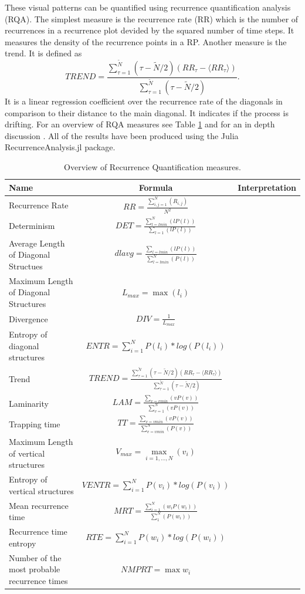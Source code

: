 \documentclass{article}
\begin{document}
These visual patterns can be quantified using recurrence quantification analysis (RQA)\cite{Zbilut}.
The simplest measure is the recurrence rate (RR) which is the number of recurrences in a recurrence plot devided by the squared number of time steps.
It measures the density of the recurrence points in a RP.
Another measure is the trend.
It is defined as
$$ TREND= \frac{\sum_{\tau=1}^{\tilde{N}}(\tau - \tilde{N}/2)(RR_\tau - \langle RR_\tau \rangle)}{\sum_{\tau=1}^{\tilde{N}}(\tau - \tilde{N}/2)}.$$
It is a linear regression coefficient over the recurrence rate of the diagonals in comparison to their distance to the main diagonal.
It indicates if the process is drifting.
For an overview of RQA measures see  Table \ref{RQA_table} and for an in depth discussion \cite{Marwan06}.
All of the results have been produced using the Julia RecurrenceAnalysis.jl package\cite{RQA.jl}.
\renewcommand{\arraystretch}{2}
\begin{table}[]
\begin{tabular}{@{}lcc@{}}
\toprule
 Name & Formula & Interpretation \\
 \midrule
 Recurrence Rate & $ RR= \frac{\sum\limits_{i,j=1}^N(R_{i,j})}{N^2} $ &  \\
 Determinism & $DET=\frac{\sum\limits_{l=lmin}^N(l P(l))}{\sum_{l=1}(l P(l))} $ &  \\
 Average Length of Diagonal Structues & $dlavg=\frac{\sum_{l=lmin}(l P(l))}{\sum_{l=lmin}^{N}(P(l))}$  &  \\
 Maximum Length of Diagonal Structures & $L_{max}=\max(l_i)$ &  \\
 Divergence & $DIV=\frac{1}{L_{max}}$ &  \\
 Entropy of diagonal structures & $ENTR=\sum\limits_{i=1}^N P(l_i) * log(P(l_i))$ &  \\
 Trend & $ TREND=\frac{\sum_{\tau=1}^{\tilde{N}}(\tau - \tilde{N}/2)(RR_\tau - \langle RR_\tau \rangle)}{\sum_{\tau=1}^{\tilde{N}}(\tau - \tilde{N}/2)}$ &  \\
 Laminarity & $LAM=\frac{\sum_{v=vmin}(v P(v))}{\sum_{v=1}^{N}(v P(v))}$ &  \\
 Trapping time & $TT=\frac{\sum_{v=vmin}(v P(v))}{\sum_{v=vmin}^{N}(P(v))}$ &  \\
 Maximum Length of vertical structures & $V_{max}=\max\limits_{i=1, ..., N}(v_i)$ &  \\
 Entropy of vertical structures& $VENTR=\sum\limits_{i=1}^N P(v_i) * log(P(v_i))$ &  \\
 Mean recurrence time & $MRT=\frac{\sum\limits_{i=1}^N(w_i P(w_i))}{\sum_{1}^{N}(P(w_i))}$  &  \\
 Recurrence time entropy & $RTE =\sum\limits_{i=1}^N P(w_i) * log(P(w_i))$  & \\
 Number of the most probable recurrence times & $NMPRT=\max w_i$ & \\ \bottomrule
\end{tabular}
\caption{Overview of Recurrence Quantification measures.}
\label{RQA_table}
\end{table}
\end{document}
